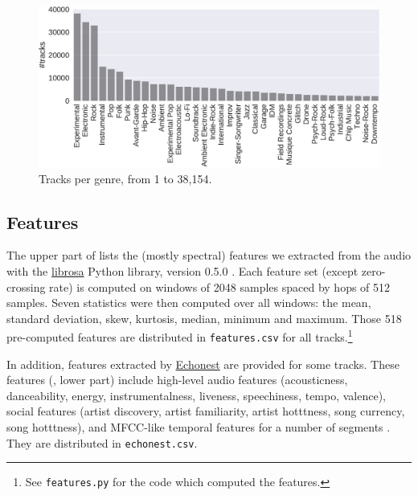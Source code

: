 \documentclass{article}
\begin{document}
\begin{figure}[t]
	\centering
	\includegraphics[width=\linewidth]{genre_distribution.pdf}
	\caption{Tracks per genre, from 1 to 38,154.}
	\label{fig:genre_distribution}
\end{figure}

\subsection{Features} %

The upper part of  lists the (mostly spectral) features we extracted from the audio with the \href{https://github.com/librosa/librosa}{librosa} Python library, version 0.5.0 \cite{librosa}.
Each feature set (except zero-crossing rate) is computed on windows of 2048 samples spaced by hops of 512 samples. Seven statistics were then computed over all windows: the mean, standard deviation, skew, kurtosis, median, minimum and maximum.
Those 518 pre-computed features are distributed in \texttt{features.csv} for all tracks.\footnote{See \texttt{features.py} for the code which computed the features.}

In addition,
features extracted by \href{http://the.echonest.com/}{Echonest} are provided for some tracks. These features (, lower part) include high-level audio features (acousticness, danceability, energy, instrumentalness, liveness, speechiness, tempo, valence), social features (artist discovery, artist familiarity, artist hotttness, song currency, song hotttness), and MFCC-like temporal features for a number of segments \cite{echonest_temporal}. They are distributed in \texttt{echonest.csv}.
\end{document}
